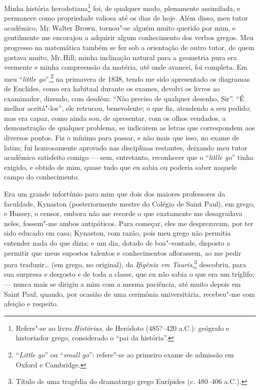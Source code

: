 Minha história herodotiana\footnote{Refere"-se ao livro
  \textit{Histórias}, de Heródoto (485?--420 a.C.): geógrafo e historiador
  grego, considerado o ``pai da história''.} foi, de
qualquer modo, plenamente assimilada, e permanece como propriedade
valiosa até os dias de hoje. Além disso, meu tutor acadêmico, Mr.\,Walter
Brown, tornou"-se alguém muito querido por mim, e gentilmente me
encorajou a adquirir algum conhecimento dos verbos gregos. Meu progresso
na matemática também se fez sob a orientação de outro tutor, de quem
gostava muito, Mr.\,Hill; minha inclinação natural para a geometria pura
era veemente e minha compreensão da matéria, até onde avancei, foi
completa. Em meu ``\textit{little go}'',\footnote{``\textit{Little go}'' ou
  ``\textit{small go}'': refere"-se ao primeiro exame de admissão em Oxford
  e Cambridge.} na primavera de 1838, tendo me sido
apresentado os diagramas de Euclides, como era habitual durante os
exames, devolvi os livros ao examinador, dizendo, com desdém: ``Não
preciso de qualquer desenho, Sir''. ``É melhor aceitá"-los'', ele
retrucou, benevolente; o que fiz, atendendo a seu pedido; mas era capaz,
como ainda sou, de apresentar, com os olhos vendados, a demonstração de
qualquer problema, se indicarem as letras que correspondem aos diversos
pontos. Fiz o mínimo para passar, e não mais que isso, no exame de
latim; fui honrosamente aprovado nas disciplinas restantes, deixando meu
tutor acadêmico satisfeito comigo --- sem, entretanto, reconhecer que o
``\textit{litlle go}'' tinha exigido, e obtido de mim, quase tudo que eu
sabia ou poderia saber naquele campo do conhecimento.

Era um grande infortúnio para mim que dois dos maiores professores
da faculdade, Kynaston (posteriormente mestre do Colégio de Saint Paul),
em grego, e Hussey, o censor, embora não me recorde o que exatamente me
desagradava neles, fossem"-me ambos antipáticos. Para começar, eles me
desprezavam, por ter sido educado em casa; Kynaston, com razão, pois meu
grego não permitia entender nada do que dizia; e um dia, dotado de
boa"-vontade, disposto a permitir que meus supostos talentos e
conhecimentos aflorassem, ao me pedir para traduzir\ldots{} (em grego, no
original), da \textit{Ifigênia em Tauris},\footnote{Título de uma tragédia
  do dramaturgo grego Eurípides (c. 480--406 a.C.).} descobriu, para sua surpresa e desgosto e de toda a classe,
que eu não sabia o que era um tríglifo; --- nunca mais se dirigiu a mim
com a mesma paciência, até muito depois em Saint Paul, quando, por
ocasião de uma cerimônia universitária, recebeu"-me com afeição e
respeito.

